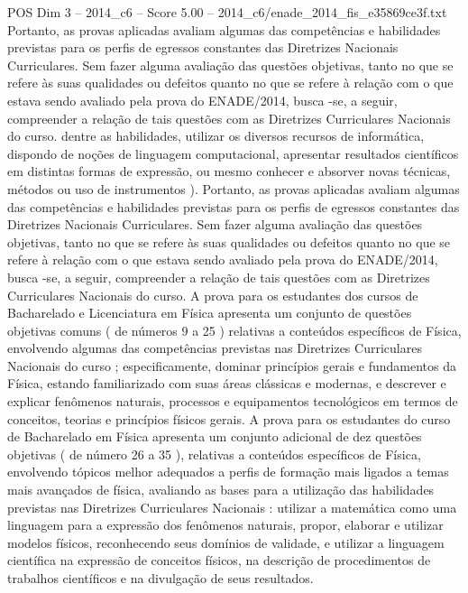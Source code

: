 \begin{textsample}{POS Dim 3 – 2014\_c6 – Score 5.00 – 2014\_c6/enade\_2014\_fis\_e35869ce3f.txt}
Portanto, as provas aplicadas avaliam algumas das competências e habilidades previstas para os perfis de egressos constantes das Diretrizes Nacionais Curriculares.
Sem fazer alguma avaliação das questões objetivas, tanto no que se refere às suas qualidades ou defeitos quanto no que se refere à relação com o que estava sendo avaliado pela prova do ENADE/2014, busca -se, a seguir, compreender a relação de tais questões com as Diretrizes Curriculares Nacionais do curso. dentre as habilidades, utilizar os diversos recursos de informática, dispondo de noções de linguagem computacional, apresentar resultados científicos em distintas formas de expressão, ou mesmo conhecer e absorver novas técnicas, métodos ou uso de instrumentos ).
Portanto, as provas aplicadas avaliam algumas das competências e habilidades previstas para os perfis de egressos constantes das Diretrizes Nacionais Curriculares.
Sem fazer alguma avaliação das questões objetivas, tanto no que se refere às suas qualidades ou defeitos quanto no que se refere à relação com o que estava sendo avaliado pela prova do ENADE/2014, busca -se, a seguir, compreender a relação de tais questões com as Diretrizes Curriculares Nacionais do curso.
A prova para os estudantes dos cursos de Bacharelado e Licenciatura em Física apresenta um conjunto de questões objetivas comuns ( de números 9 a 25 ) relativas a conteúdos específicos de Física, envolvendo algumas das competências previstas nas Diretrizes Curriculares Nacionais do curso ; especificamente, dominar princípios gerais e fundamentos da Física, estando familiarizado com suas áreas clássicas e modernas, e descrever e explicar fenômenos naturais, processos e equipamentos tecnológicos em termos de conceitos, teorias e princípios físicos gerais.
A prova para os estudantes do curso de Bacharelado em Física apresenta um conjunto adicional de dez questões objetivas ( de número 26 a 35 ), relativas a conteúdos específicos de Física, envolvendo tópicos melhor adequados a perfis de formação mais ligados a temas mais avançados de física, avaliando as bases para a utilização das habilidades previstas nas Diretrizes Curriculares Nacionais : utilizar a matemática como uma linguagem para a expressão dos fenômenos naturais, propor, elaborar e utilizar modelos físicos, reconhecendo seus domínios de validade, e utilizar a linguagem científica na expressão de conceitos físicos, na descrição de procedimentos de trabalhos científicos e na divulgação de seus resultados.

\end{textsample}
